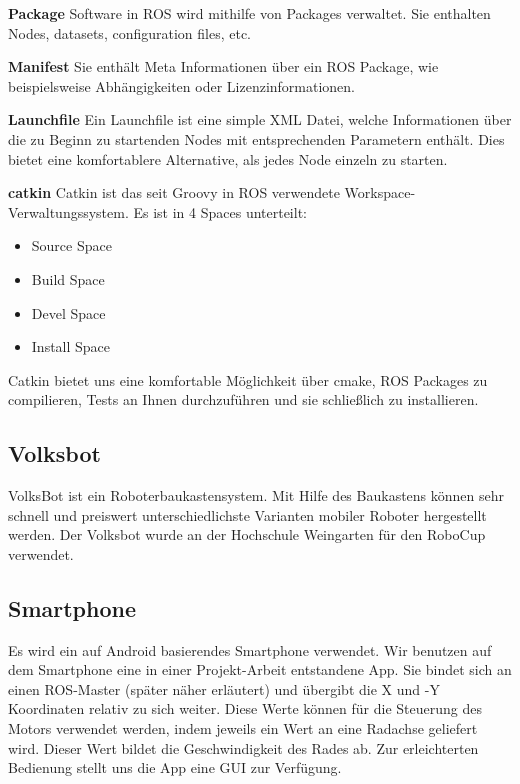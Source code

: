 \documentclass[12pt]{article}
\begin{document}
{\bf Package} Software in ROS wird mithilfe von Packages verwaltet.
Sie enthalten Nodes, datasets, configuration files, etc.

{\bf Manifest} Sie enthält Meta Informationen über ein ROS Package, wie beispielsweise Abhängigkeiten oder Lizenzinformationen.

{\bf Launchfile} Ein Launchfile ist eine simple XML Datei, welche Informationen über die zu Beginn zu startenden Nodes mit entsprechenden Parametern enthält.
Dies bietet eine komfortablere Alternative, als jedes Node einzeln zu starten.
 
{\bf catkin} Catkin ist das seit Groovy in ROS verwendete Workspace-Verwaltungssystem.
Es ist in 4 Spaces unterteilt:
\begin{itemize}
\item Source Space
\item Build Space
\item Devel Space
\item Install Space
\end{itemize}
Catkin bietet uns eine komfortable Möglichkeit über cmake, ROS Packages zu compilieren, Tests an Ihnen durchzuführen und sie schließlich zu installieren.

\subsection{Volksbot}

VolksBot ist ein Roboterbaukastensystem.
Mit Hilfe des Baukastens können sehr schnell und preiswert unterschiedlichste Varianten mobiler Roboter hergestellt werden.
Der Volksbot wurde an der Hochschule Weingarten für den RoboCup verwendet.

\subsection{Smartphone}

Es wird ein auf Android basierendes Smartphone verwendet.
Wir benutzen auf dem Smartphone eine in einer Projekt-Arbeit entstandene App.
Sie bindet sich an einen ROS-Master (später näher erläutert) und übergibt die X und -Y Koordinaten relativ zu sich weiter.
Diese Werte können für die Steuerung des Motors verwendet werden, indem jeweils ein Wert an eine Radachse geliefert wird. Dieser Wert bildet die Geschwindigkeit des Rades ab.
Zur erleichterten Bedienung stellt uns die App eine GUI zur Verfügung. 
\end{document}
